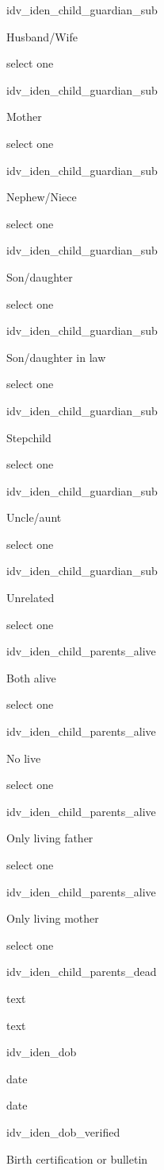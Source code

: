 \documentclass[]{article}
\begin{document}
idv\_iden\_child\_guardian\_sub

Husband/Wife

select one

idv\_iden\_child\_guardian\_sub

Mother

select one

idv\_iden\_child\_guardian\_sub

Nephew/Niece

select one

idv\_iden\_child\_guardian\_sub

Son/daughter

select one

idv\_iden\_child\_guardian\_sub

Son/daughter in law

select one

idv\_iden\_child\_guardian\_sub

Stepchild

select one

idv\_iden\_child\_guardian\_sub

Uncle/aunt

select one

idv\_iden\_child\_guardian\_sub

Unrelated

select one

idv\_iden\_child\_parents\_alive

Both alive

select one

idv\_iden\_child\_parents\_alive

No live

select one

idv\_iden\_child\_parents\_alive

Only living father

select one

idv\_iden\_child\_parents\_alive

Only living mother

select one

idv\_iden\_child\_parents\_dead

text

text

idv\_iden\_dob

date

date

idv\_iden\_dob\_verified

Birth certification or bulletin
\end{document}
